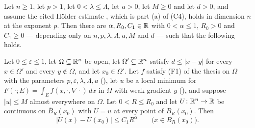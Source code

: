 \begin{lemma}
Let $n\ge1$, let $p>1$, let $0<\lambda\le\Lambda$, let $a>0$, let $M\ge0$ and
let $d>0$, and assume the cited H\"older estimate
, which is part (a) of (C4), holds in
dimension $n$ at the exponent $p$.  Then there are
$\alpha,R_0,C_1\in\mathbb{R}$ with $0<\alpha\le1$, $R_0>0$ and $C_1\ge0$ --- depending
only on $n,p,\lambda,\Lambda,a,M$ and $d$ --- such that the following holds.

Let $0\le\varepsilon\le1$, let $\Omega\subseteq\mathbb{R}^n$ be open, let
$\Omega'\subseteq\mathbb{R}^n$ satisfy $d\le|x-y|$ for every $x\in\Omega'$ and every
$y\notin\Omega$, and let $x_0\in\Omega'$.  Let $f$ satisfy (F1) of the thesis on
$\Omega$ with the parameters $p,\varepsilon,\lambda,\Lambda,a$
(), let $u$ be a local minimum for
$F(\cdot;E)=\int_Ef(x,\cdot,\nabla\cdot)\,dx$ in $\Omega$ with weak gradient $g$
(), and suppose $|u|\le M$ almost everywhere on
$\Omega$.  Let $0<R\le R_0$ and let $U\colon\mathbb{R}^n\to\mathbb{R}$ be continuous on
$\overline B_R(x_0)$ with $U=u$ at every point of $B_R(x_0)$.  Then
\[
|U(x)-U(x_0)|\le C_1R^{\alpha}\qquad\bigl(x\in\overline B_R(x_0)\bigr).
\]
\end{lemma}
